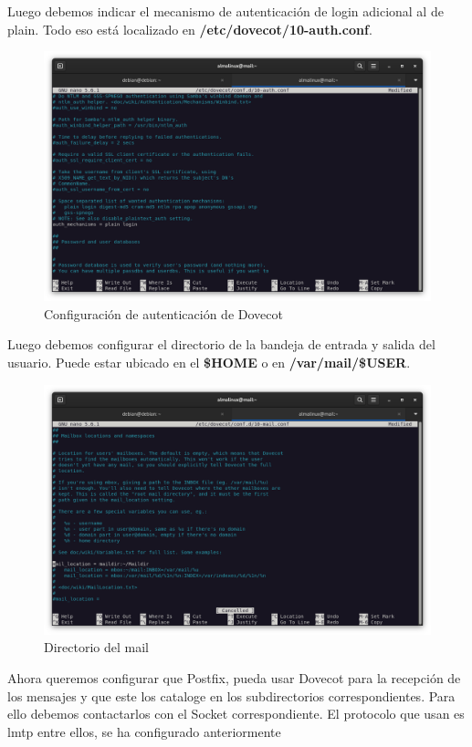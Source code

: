 Luego debemos indicar el mecanismo de autenticación de login adicional al de plain. Todo eso está localizado en \textbf{/etc/dovecot/10-auth.conf}.

\begin{figure}[H]
	\centering
	\includegraphics[scale=0.30]{12}
	\caption{Configuración de autenticación de Dovecot}
\end{figure}

Luego debemos configurar el directorio de la bandeja de entrada y salida del usuario. Puede estar ubicado en el \textbf{\$HOME} o en \textbf{/var/mail/\$USER}.

\begin{figure}[H]
	\centering
	\includegraphics[scale=0.30]{13}
	\caption{Directorio del mail}
\end{figure}

Ahora queremos configurar que Postfix, pueda usar Dovecot para la recepción de los mensajes y que este los cataloge en los subdirectorios correspondientes. Para ello debemos contactarlos con el Socket correspondiente. El protocolo que usan es lmtp entre ellos, se ha configurado anteriormente

